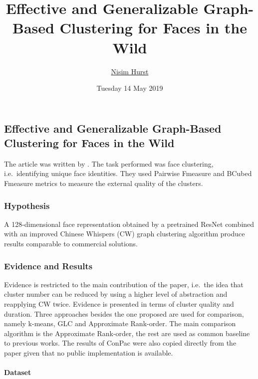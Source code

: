 \documentclass[17pt,]{extarticle}
\title{Effective and Generalizable Graph-Based Clustering for Faces in the Wild}
\author{\href{mailto:langheran@gmail.com}{Nisim Hurst}}
\date{Tuesday 14 May 2019}
\let\oldparagraph\paragraph
\renewcommand{\paragraph}[1]{\oldparagraph{#1}\mbox{}}
\begin{document}
\maketitle

\label{toc}

\hypertarget{effective-and-generalizable-graph-based-clustering-for-faces-in-the-wild}{%
\subsection{Effective and Generalizable Graph-Based Clustering for Faces in the Wild}\label{effective-and-generalizable-graph-based-clustering-for-faces-in-the-wild}}

The article was written by \autocite{leonardochang2018}. The task performed was face clustering, i.e.~identifying unique face identities. They used Pairwise Fmeasure and BCubed Fmeasure metrics to measure the external quality of the clusters.

\hypertarget{hypothesis}{%
\subsubsection{Hypothesis}\label{hypothesis}}

A 128-dimensional face representation obtained by a pretrained ResNet combined with an improved Chinese Whispers (CW) graph clustering algorithm produce results comparable to commercial solutions.

\hypertarget{evidence-and-results}{%
\subsubsection{Evidence and Results}\label{evidence-and-results}}

Evidence is restricted to the main contribution of the paper, i.e.~the idea that cluster number can be reduced by using a higher level of abstraction and reapplying CW twice. Evidence is presented in terms of cluster quality and duration. Three approaches besides the one proposed are used for comparison, namely k-means, GLC and Approximate Rank-order. The main comparison algorithm is the Approximate Rank-order, the rest are used as common baseline to previous works. The results of ConPac were also copied directly from the paper given that no public implementation is available.

\hypertarget{dataset}{%
\paragraph{Dataset}\label{dataset}}
\end{document}
